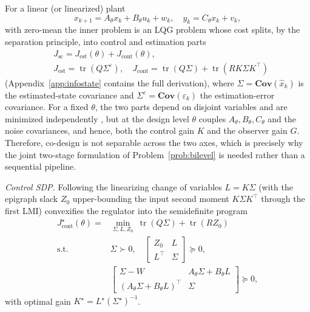 \documentclass[twocolumn,amsthm]{autart}
\begin{document}
For a linear (or linearized) plant
$$x_{k+1}=A_\theta x_k+B_\theta u_k+w_k, \quad y_k=C_\theta x_k+v_k,$$ with zero-mean
the inner problem is an LQG problem whose cost splits, by
the separation principle, into control and estimation parts
\begin{align*}
&J_{\mathrm{sc}}=J_{\mathrm{est}}(\theta)+J_{\mathrm{cont}}(\theta),\\
&J_{\mathrm{est}}=\operatorname{tr}(Q\Sigma^\varepsilon), \quad
J_{\mathrm{cont}}=\operatorname{tr}(Q\Sigma)+\operatorname{tr}(RK\Sigma K^\top)
\end{align*}
(Appendix~\ref{app:infostate} contains the full derivation), where $\Sigma=\mathbf{Cov}(\hat x_k)$ is the
estimated-state covariance and $\Sigma^\varepsilon=\mathbf{Cov}(\varepsilon_k)$ the
estimation-error covariance. For a
fixed $\theta$, the two parts depend on disjoint variables and are minimized
independently \cite{tzoumas2021lqg}, but at the design level $\theta$ couples
$A_\theta,B_\theta,C_\theta$ and the noise covariances, and hence, both the control
gain $K$ and the observer gain $G$. Therefore, co-design is not separable across the two axes, which is precisely why the joint
two-stage formulation of Problem~\ref{prob:bilevel} is needed rather than a
sequential pipeline.

\emph{Control SDP.} Following the linearizing change of
variables $L=K\Sigma$ (with the epigraph slack $Z_0$ upper-bounding the input
second moment $K\Sigma K^\top$ through the first LMI) convexifies the regulator
into the semidefinite program
\begin{equation}\label{eq:Jcont}
\begin{aligned}
J_{\mathrm{cont}}^\star(\theta) = &\min_{\Sigma,L,Z_0}\
\operatorname{tr}(Q\Sigma) + \operatorname{tr}(R Z_0)\\
\text{s.t. } & \Sigma \succ 0, \quad
\begin{bmatrix} Z_0 & L \\ L^\top & \Sigma \end{bmatrix}
\succeq 0,\\
& \begin{bmatrix}
\Sigma - W & A_\theta\Sigma + B_\theta L \\
(A_\theta\Sigma + B_\theta L)^\top & \Sigma
\end{bmatrix} \succeq 0,
\end{aligned}
\end{equation}
with optimal gain $K^\star = L^\star (\Sigma^\star)^{-1}$.
\end{document}
